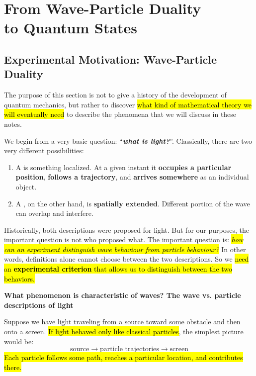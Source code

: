 \section[From Wave-Particle Duality to Quantum States]{From Wave-Particle Duality\\ to Quantum States}\label{sec:from-wave-particle-duality-to-quantum-states}

\subsection{Experimental Motivation: Wave-Particle Duality}\label{subsec:from-wave-particle-duality-to-quantum-states--experimental-motivation-wave-particle-duality}

The purpose of this section is not to give a history of the development of quantum mechanics, but rather to discover \hl{what kind of mathematical theory we will eventually need} to describe the phenomena that we will discuss in these notes.

\highspace
We begin from a very basic question: ``\emph{\textbf{what is light?}}''. Classically, there are two very different possibilities:
\begin{enumerate}
    \item A  is something localized. At a given instant it \textbf{occupies a particular position}, \textbf{follows a trajectory}, and \textbf{arrives somewhere} as an individual object.

    \item A , on the other hand, is \textbf{spatially extended}. Different portion of the wave can overlap and interfere.
\end{enumerate}
Historically, both descriptions were proposed for light. But for our purposes, the important question is not who proposed what. The important question is: \emph{\hl{how can an experiment distinguish wave behaviour from particle behaviour?}} In other words, definitions alone cannot choose between the two descriptions. So we \hl{need an \textbf{experimental criterion} that allows us to distinguish between the two behaviors.}

\highspace
\begin{flushleft}
    \textcolor{Green3}{ \textbf{What phenomenon is characteristic of waves? The wave vs. particle descriptions of light}}
\end{flushleft}
Suppose we have light traveling from a source toward some obstacle and then onto a screen. \hl{If light behaved only like classical particles}, the simplest picture would be:
\begin{equation*}
    \text{source} \to \text{particle trajectories} \to \text{screen}
\end{equation*}
\hl{Each particle follows some path, reaches a particular location, and contributes there.}

